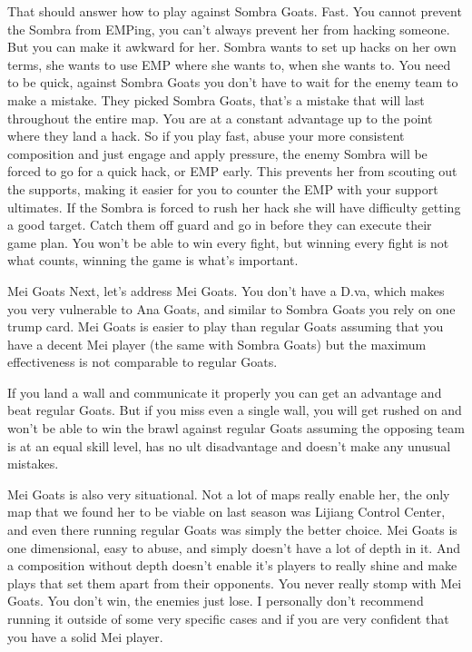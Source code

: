 That should answer how to play against Sombra Goats. Fast. You cannot prevent the Sombra from EMPing, you can’t always prevent her from hacking someone. But you can make it awkward for her. Sombra wants to set up hacks on her own terms, she wants to use EMP where she wants to, when she wants to. You need to be quick, against Sombra Goats you don’t have to wait for the enemy team to make a mistake. They picked Sombra Goats, that’s a mistake that will last throughout the entire map. You are at a constant advantage up to the point where they land a hack. So if you play fast, abuse your more consistent composition and just engage and apply pressure, the enemy Sombra will be forced to go for a quick hack, or EMP early. This prevents her from scouting out the supports, making it easier for you to counter the EMP with your support ultimates. If the Sombra is forced to rush her hack she will have difficulty getting a good target. Catch them off guard and go in before they can execute their game plan. You won’t be able to win every fight, but winning every fight is not what counts, winning the game is what’s important.

Mei Goats
Next, let’s address Mei Goats. You don’t have a D.va, which makes you very vulnerable to Ana Goats, and similar to Sombra Goats you rely on one trump card. Mei Goats is easier to play than regular Goats assuming that you have a decent Mei player (the same with Sombra Goats) but the maximum effectiveness is not comparable to regular Goats.

If you land a wall and communicate it properly you can get an advantage and beat regular Goats. But if you miss even a single wall, you will get rushed on and won’t be able to win the brawl against regular Goats assuming the opposing team is at an equal skill level, has no ult disadvantage and doesn’t make any unusual mistakes. 

Mei Goats is also very situational. Not a lot of maps really enable her, the only map that we found her to be viable on last season was Lijiang Control Center, and even there running regular Goats was simply the better choice. Mei Goats is one dimensional, easy to abuse, and simply doesn’t have a lot of depth in it. And a composition without depth doesn’t enable it’s players to really shine and make plays that set them apart from their opponents. You never really stomp with Mei Goats. You don’t win, the enemies just lose. I personally don’t recommend running it outside of some very specific cases and if you are very confident that you have a solid Mei player.

